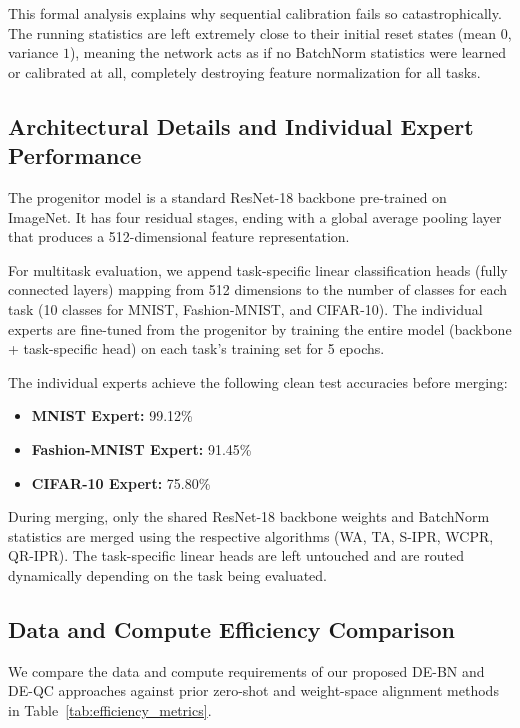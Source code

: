\documentclass{article}
\theoremstyle{plain}
\theoremstyle{definition}
\theoremstyle{remark}
\begin{document}
This formal analysis explains why sequential calibration fails so catastrophically. The running statistics are left extremely close to their initial reset states (mean $0$, variance $1$), meaning the network acts as if no BatchNorm statistics were learned or calibrated at all, completely destroying feature normalization for all tasks.

\subsection{Architectural Details and Individual Expert Performance}
\label{app:arch_details}
The progenitor model is a standard ResNet-18 backbone \cite{he2016deep} pre-trained on ImageNet. It has four residual stages, ending with a global average pooling layer that produces a 512-dimensional feature representation. 

For multitask evaluation, we append task-specific linear classification heads (fully connected layers) mapping from 512 dimensions to the number of classes for each task (10 classes for MNIST, Fashion-MNIST, and CIFAR-10). The individual experts are fine-tuned from the progenitor by training the entire model (backbone + task-specific head) on each task's training set for 5 epochs.

The individual experts achieve the following clean test accuracies before merging:
\begin{itemize}
    \item \textbf{MNIST Expert:} 99.12\%
    \item \textbf{Fashion-MNIST Expert:} 91.45\%
    \item \textbf{CIFAR-10 Expert:} 75.80\%
\end{itemize}

During merging, only the shared ResNet-18 backbone weights and BatchNorm statistics are merged using the respective algorithms (WA, TA, S-IPR, WCPR, QR-IPR). The task-specific linear heads are left untouched and are routed dynamically depending on the task being evaluated.

\subsection{Data and Compute Efficiency Comparison}
\label{app:efficiency}
We compare the data and compute requirements of our proposed DE-BN and DE-QC approaches against prior zero-shot and weight-space alignment methods in Table~\ref{tab:efficiency_metrics}.
\end{document}
